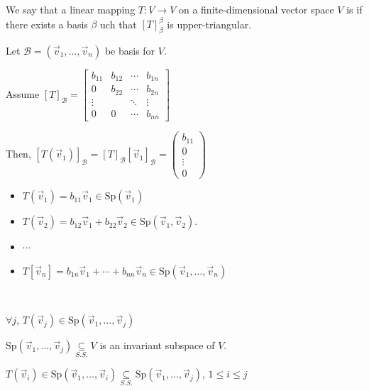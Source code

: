 \documentclass[11pt,fleqn]{book} %
\begin{document}
\setcounter{chapter}{6}
\setcounter{dummy}{3}
\begin{proposition}[Triangularizable]
    We say that a linear mapping $T: V \to V$ on a finite-dimensional vector space $V$ is  if there exists a basis $\beta$ uch that $[T]_\beta^\beta$ is upper-triangular.
\end{proposition}
\setcounter{chapter}{4}

Let $\mathcal{B} = (\vec{v}_1, \dots, \vec{v}_n)$ be basis for $V$.

Assume $[T]_\mathcal{B} =\begin{bmatrix} b_{11} &b_{12} & \cdots &b_{1n} \\ 0 &b_{22} &\cdots &b_{2n} \\ \vdots & &\ddots &\vdots \\ 0 &0 &\cdots &b_{nn} \end{bmatrix}$

Then, $[T(\vec{v}_1)]_\mathcal{B} = [T]_\mathcal{B}[\vec{v}_1]_\mathcal{B} = \begin{pmatrix} b_{11} \\ 0 \\\vdots \\ 0 \end{pmatrix}$

\begin{itemize}
    \item $T(\vec{v}_1) = b_{11}\vec{v}_1 \in \mathrm{Sp}(\vec{v}_1)$
    \item $T(\vec{v}_2) = b_{12}\vec{v}_1 + b_{22}\vec{v}_2 \in \mathrm{Sp}(\vec{v}_1, \vec{v}_2)$.
    \item $\cdots$
    \item $T[\vec{v}_n] = b_{1n}\vec{v}_1 + \cdots + b_{nn}\vec{v}_n \in \mathrm{Sp}(\vec{v}_1, \dots, \vec{v}_n)$
\end{itemize}

{~~~}

$\forall j$, $T(\vec{v}_j) \in \mathrm{Sp}(\vec{v}_1, \dots, \vec{v}_j)$

$\mathrm{Sp}(\vec{v}_1, \dots, \vec{v}_j) \underset{S.S.}{\subseteq} V$ is an invariant subspace of $V$.

$T(\vec{v}_i) \in \mathrm{Sp}(\vec{v}_1, \dots, \vec{v}_i) \underset{S.S.}{\subseteq} \mathrm{Sp}(\vec{v}_1, \dots, \vec{v}_j)$, $1 \le i \le j$
\end{document}
